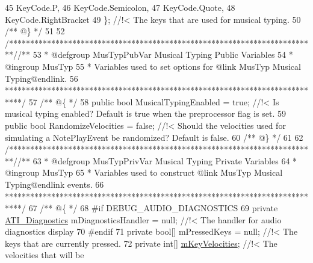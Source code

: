 \begin{DoxyCodeInclude}
45             KeyCode.P,
46             KeyCode.Semicolon,
47             KeyCode.Quote,
48             KeyCode.RightBracket
49         \}; \textcolor{comment}{//!< The keys that are used for musical typing.}
50 \textcolor{comment}{}\textcolor{comment}{    /** @\} */}
51 
52     \textcolor{comment}{/*************************************************************************/}\textcolor{comment}{/** }
53 \textcolor{comment}{    * @defgroup MusTypPubVar Musical Typing Public Variables}
54 \textcolor{comment}{    * @ingroup MusTyp}
55 \textcolor{comment}{    * Variables used to set options for @link MusTyp Musical Typing@endlink.}
56 \textcolor{comment}{    ****************************************************************************/}\textcolor{comment}{}
57 \textcolor{comment}{    /** @\{ */}
58     \textcolor{keyword}{public} \textcolor{keywordtype}{bool}                          MusicalTypingEnabled = \textcolor{keyword}{true}; \textcolor{comment}{//!< Is musical typing enabled?
       Default is true when the preprocessor flag is set.}
59 \textcolor{comment}{}    \textcolor{keyword}{public} \textcolor{keywordtype}{bool}                          RandomizeVelocities = \textcolor{keyword}{false}; \textcolor{comment}{//!< Should the velocities used for
       simulating a NotePlayEvent be randomized? Default is false.}
60 \textcolor{comment}{}\textcolor{comment}{    /** @\} */}
61 
62     \textcolor{comment}{/*************************************************************************/}\textcolor{comment}{/** }
63 \textcolor{comment}{    * @defgroup MusTypPrivVar Musical Typing Private Variables}
64 \textcolor{comment}{    * @ingroup MusTyp}
65 \textcolor{comment}{    * Variables used to construct @link MusTyp Musical Typing@endlink events.}
66 \textcolor{comment}{    ****************************************************************************/}\textcolor{comment}{}
67 \textcolor{comment}{    /** @\{ */}
68 \textcolor{preprocessor}{    #if DEBUG\_AUDIO\_DIAGNOSTICS}
69         \textcolor{keyword}{private} \hyperlink{group___audio_testing_class_a_t_i___diagnostics}{ATI\_Diagnostics}               mDiagnosticsHandler = null; \textcolor{comment}{//!< The handler
       for audio diagnostics display}
70 \textcolor{comment}{}\textcolor{preprocessor}{    #endif}
71     \textcolor{keyword}{private} \textcolor{keywordtype}{bool}[]                        mPressedKeys = null; \textcolor{comment}{//!< The keys that are currently pressed.}
72 \textcolor{comment}{}    \textcolor{keyword}{private} \textcolor{keywordtype}{int}[]                         \hyperlink{group___mus_typ_priv_var_ga4836c9fe1805279497f421a29879bf5a}{mKeyVelocities}; \textcolor{comment}{//!< The velocities that will be
}
\end{DoxyCodeInclude}
